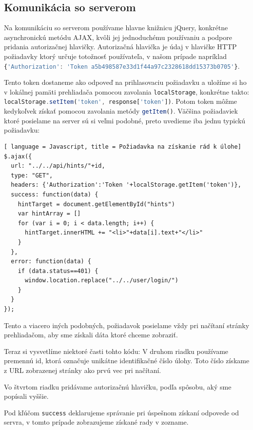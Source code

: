 \subsection{Komunikácia so serverom}
Na komunikáciu so serverom používame hlavne knižnicu jQuery, konkrétne asynchronickú metódu AJAX, kvôli jej jednoduchému
používaniu a podpore pridania autorizačnej hlavičky. Autorizačná hlavička
je údaj v hlavičke HTTP požiadavky ktorý určuje totožnosť používateľa, v našom prípade napríklad
\lstinline[language=Javascript]|{'Authorization': 'Token a5b498587e33d1f44a97c2328618dd15373b0705'}|.

Tento token dostaneme ako odpoveď na prihlasovaciu požiadavku a uložíme si ho
v lokálnej pamäti prehliadača pomocou zavolania
\lstinline[language=Javascript]|localStorage|, konkrétne takto:\newline
\lstinline[language=Javascript]|localStorage.setItem('token', response['token'])|.
Potom token môžme kedykoľvek získať pomocou zavolania metódy
\lstinline[language=Javascript]|getItem()|.
Väčšina požiadaviek ktoré posielame na server sú si veľmi podobné, preto uvedieme
iba jednu typickú požiadavku:

\begin{lstlisting}[ language = Javascript, title = Požiadavka na získanie rád k úlohe]
$.ajax({
  url: "../../api/hints/"+id,
  type: "GET",
  headers: {'Authorization':'Token '+localStorage.getItem('token')},
  success: function(data) {
    hintTarget = document.getElementById("hints")
    var hintArray = []
    for (var i = 0; i < data.length; i++) {
      hintTarget.innerHTML += "<li>"+data[i].text+"</li>"
    }
  },
  error: function(data) {
    if (data.status==401) {
      window.location.replace("../../user/login/")
    }
  }
});
\end{lstlisting}

Tento a viacero iných podobných, požiadavok posielame vždy pri načítaní stránky
prehliadačom, aby sme získali dáta ktoré chceme zobraziť.

Teraz si vysvetlíme niektoré časti tohto kódu:\newline
V druhom riadku používame premennú id, ktorá označuje unikátne identifikačné číslo
úlohy. Toto číslo získame z URL zobrazenej stránky ako prvú vec pri načítaní.

Vo štvrtom riadku pridávame autorizačnú hlavičku, podľa spôsobu, aký sme popísali vyššie.

Pod kľúčom \lstinline[language=Javascript]|success| deklarujeme správanie pri úspešnom získaní odpovede
od servra, v tomto prípade zobrazujeme získané rady v zozname.

